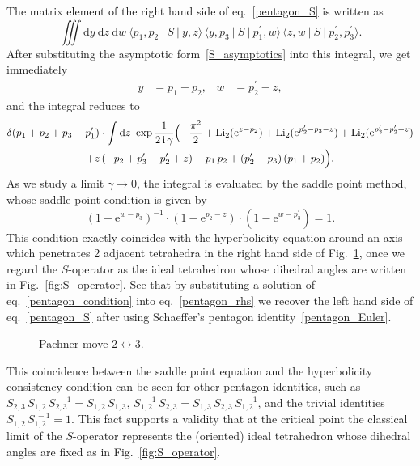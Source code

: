 \documentclass[12pt]{article}
\numberwithin{equation}{section}
\newcommand{\Li}{\mathrm{Li}_2}
\begin{document}
The matrix element of the right hand side of eq.~\eqref{pentagon_S}
is written as
\begin{equation}
  \label{pentagon_rhs}
  \iiint \mathrm{d} y \ \mathrm{d} z \
  \mathrm{d} w \
  \langle p_1, p_2 \ | \  S \  | \ y,z \rangle \,
  \langle y, p_3 \ | \  S \  | \  p_1^\prime ,w \rangle \,
  \langle z, w \ | \ S \  | \  p_2^\prime , p_3^\prime \rangle   .
\end{equation}
After  substituting  the asymptotic form~\eqref{S_asymptotics} into this
integral,
we get immediately
\begin{align*}
  y &= p_1 + p_2 ,
  &
  w &= p_2^\prime -z ,
\end{align*}
and the integral reduces to
\begin{multline*}
  \delta(p_1 + p_2 + p_3 - p_1^\prime) \cdot
  \int \mathrm{d} z \
  \exp \frac{1}{2 \, \mathrm{i} \, \gamma}
  \Bigl(
  -\frac{\pi^2}{2}
  + \Li(\mathrm{e}^{z-p_2})
  + \Li(\mathrm{e}^{p_2^\prime - p_3 - z})
  + \Li(\mathrm{e}^{p_3^\prime - p_2^\prime + z})
  \\
  + z \, (-p_2 + p_3^\prime - p_2^\prime + z)
  - p_1 \, p_2 + ( p_2^\prime - p_3) \, ( p_1 + p_2)
  \Bigr).
\end{multline*}
As we study a limit $\gamma\to 0$, the integral is evaluated by the
saddle point method, whose
saddle point condition  is given by
\begin{equation}
  \label{pentagon_condition}
  ( 1 - \mathrm{e}^{w-p_3} )^{-1} \cdot
  ( 1 - \mathrm{e}^{p_2-z}) \cdot
  ( 1 - \mathrm{e}^{w-p_3^\prime}) = 1 .
\end{equation}
This condition  exactly coincides with the hyperbolicity equation
around an axis which penetrates 2 adjacent 
tetrahedra in the right hand side of
Fig.~\ref{fig:pentagon},
once we regard the $S$-operator as the ideal tetrahedron
whose dihedral angles are written in Fig.~\ref{fig:S_operator}.
See that by substituting  a  solution of
eq.~\eqref{pentagon_condition}
into eq.~\eqref{pentagon_rhs} we  recover the left hand side of
eq.~\eqref{pentagon_S} after  using  Schaeffer's pentagon
identity~\eqref{pentagon_Euler}.

\begin{figure}[htbp]
  \begin{center}
    \caption{Pachner move $2 \leftrightarrow 3$.}
    \label{fig:pentagon}
  \end{center}
\end{figure}

This coincidence between the   saddle point equation and the
hyperbolicity consistency condition can be seen for other pentagon identities,
such as
$S_{2,3} \, S_{1,2} \, S_{2,3}^{~-1} = S_{1,2} \, S_{1,3}$,
$S_{1,2}^{~-1} \, S_{2,3} = S_{1,3} \, S_{2,3} \, S_{1,2}^{~-1}$,
and the trivial identities
$S_{1,2} \, S_{1,2}^{~-1} = 1$.
This fact supports a validity
that at the critical point the classical limit of the  $S$-operator
represents the (oriented) ideal tetrahedron
whose dihedral angles are fixed as in Fig.~\ref{fig:S_operator}.
\end{document}
